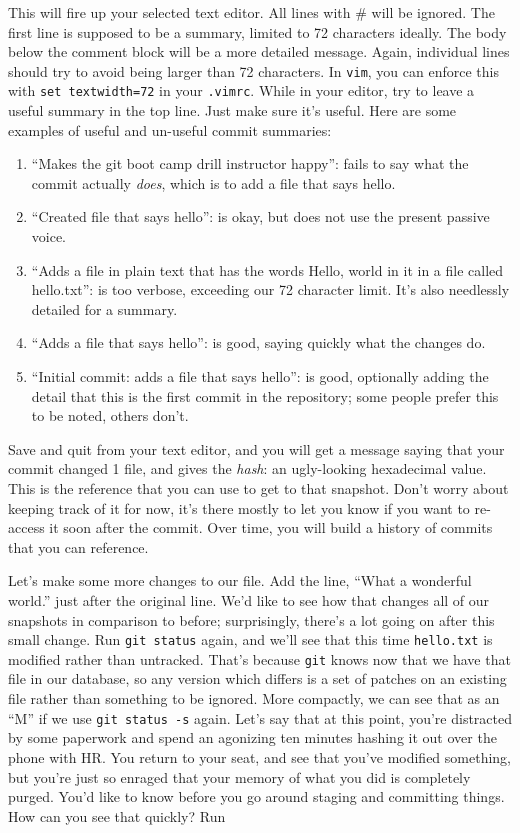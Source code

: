 \par{
This will fire up your selected text editor. All lines with \# will be
ignored. The first line is supposed to be a summary, limited to 72 characters
ideally. The body below the comment block will be a more detailed message.
Again, individual lines should try to avoid being larger than 72 characters.
In \verb+vim+, you can enforce this with \verb+set textwidth=72+ in your
\verb+.vimrc+. While in your editor, try to leave a useful summary in the top
line. Just make sure it's useful. Here are some examples of useful and
un-useful commit summaries:
}

\begin{enumerate}
    \item ``Makes the git boot camp drill instructor happy'': fails to say
    what the commit actually \emph{does}, which is to add a file that says
    hello.
    \item ``Created file that says hello'': is okay, but does not use the
    present passive voice. 
    \item ``Adds a file in plain text that has the words Hello, world in it in
    a file called hello.txt'': is too verbose, exceeding our 72 character
    limit. It's also needlessly detailed for a summary.
    \item ``Adds a file that says hello'': is good, saying quickly what the
    changes do. 
    \item ``Initial commit: adds a file that says hello'': is good, optionally
    adding the detail that this is the first commit in the repository; some
    people prefer this to be noted, others don't. 
\end{enumerate}

\par{
Save and quit from your text editor, and you will get a message saying that
your commit changed 1 file, and gives the \emph{hash}: an ugly-looking
hexadecimal value. This is the reference that you can use to get to that
snapshot. Don't worry about keeping track of it for now, it's there mostly to
let you know if you want to re-access it soon after the commit. Over time, you
will build a history of commits that you can reference.
}

\par{
Let's make some more changes to our file. Add the line, ``What a wonderful
world.'' just after the original line. We'd like to see how that changes all
of our snapshots in comparison to before; surprisingly, there's a lot going on
after this small change. Run \verb+git status+ again, and we'll see that this
time \verb+hello.txt+ is modified rather than untracked. That's because
\verb+git+ knows now that we have that file in our database, so any version
which differs is a set of patches on an existing file rather than something to
be ignored. More compactly, we can see that as an ``M'' if we use \verb+git status -s+ again. 
Let's say that at this point, you're distracted by some
paperwork and spend an agonizing ten minutes hashing it out over the phone
with HR. You return to your seat, and see that you've modified something, but
you're just so enraged that your memory of what you did is completely purged.
You'd like to know before you go around staging and committing things. How can
you see that quickly? Run
}

